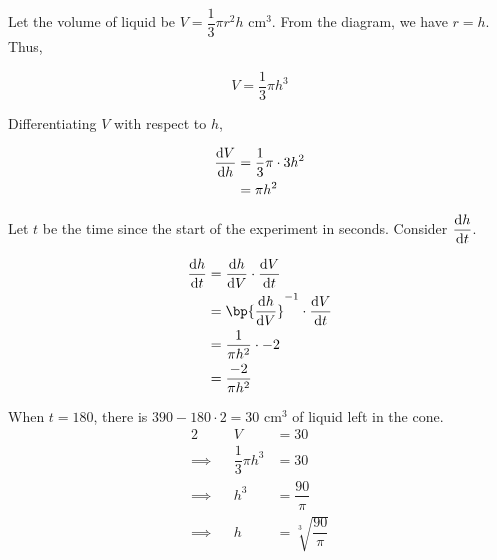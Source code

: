 \documentclass{echw}
\begin{document}
        \begin{center}
        \end{center}

        Let the volume of liquid be $V = \dfrac13 \pi r^2 h$ cm$^3$. From the diagram, we have $r = h$. Thus,

        \[
            V = \dfrac13 \pi h^3
        \]

        Differentiating $V$ with respect to $h$,

        \begin{align*}
            \dfrac{\mathrm{d} V}{\mathrm{d} h}&= \dfrac13 \pi \cdot 3 h^2\\
            &= \pi h^2
        \end{align*}

        Let $t$ be the time since the start of the experiment in seconds. Consider $\dfrac{\mathrm{d} h}{\mathrm{d} t}$.

        \begin{align*}
            \der{h}{t} &= \der{h}{V} \cdot \der{V}{t}\\
            &= \bp{\der{h}{V}}^{-1} \cdot \der{V}{t}\\
            &= \dfrac1{\pi h^2} \cdot -2\\
            &= \dfrac{-2}{\pi h^2}
        \end{align*}

        When $t = 180$, there is $390 - 180\cdot2 = 30$ cm$^3$ of liquid left in the cone.
        \begin{alignat*}{2}
            &&V &= 30\\
            \implies&&\dfrac13 \pi h^3 &= 30\\
            \implies&&h^3 &= \dfrac{90}{\pi}\\
            \implies&&h &= \sqrt[3]{\dfrac{90}{\pi}}
        \end{alignat*}
\end{document}
